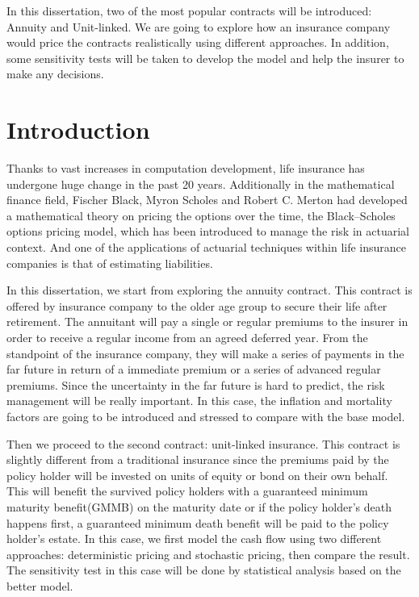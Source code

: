 \documentclass{report}
\begin{document}
In this dissertation, two of the most popular contracts will be introduced:
Annuity and Unit-linked. We are going to explore how an insurance
company would price the contracts realistically using different approaches.  In
addition, some sensitivity tests will be taken to develop the model and help the
insurer to make any decisions.






\chapter*{Introduction}


Thanks to vast increases in computation development, life insurance has undergone huge change in the past 20 years. Additionally in the mathematical finance field, Fischer Black, Myron Scholes and Robert C. Merton had developed a mathematical theory on pricing the options over the time, the Black–Scholes options pricing model, which has been introduced to manage the risk in actuarial context. And one of the applications of actuarial techniques within life insurance companies is that of estimating liabilities.


In this dissertation, we start from exploring the annuity contract. This contract is offered by insurance company to the older age group to secure their life after retirement. The annuitant will pay a single or regular premiums to the insurer in order to receive a regular income from an agreed deferred year. From the standpoint of the insurance company, they will make a series of payments in the far future in return of a immediate premium or a series of advanced regular premiums. Since the uncertainty in the far future is hard to predict, the risk management will be really important. In this case, the inflation and mortality factors are going to be introduced and stressed to compare with the base model.


Then we proceed to the second contract: unit-linked insurance. This contract is slightly different from a traditional insurance since the premiums paid by the policy holder will be invested on units of equity or bond on their own behalf.  This will benefit the survived policy holders with a guaranteed minimum maturity benefit(GMMB) on the maturity date or if the policy holder's death happens first, a guaranteed minimum death benefit will be paid to the policy holder's estate. In this case, we first model the cash flow using two different approaches: deterministic pricing and stochastic pricing, then compare the result. The sensitivity test in this case will be done by statistical analysis based on the better model.
\end{document}
